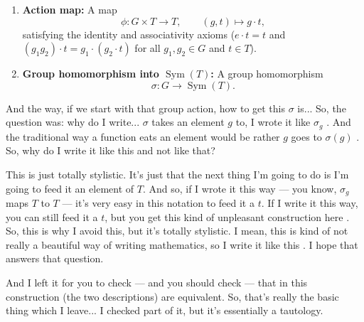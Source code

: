 \begin{content}
\begin{enumerate}[label=\textbf{\arabic*.}]
    \item \textbf{Action map:} A map
    \[
    \phi \colon G \times T \to T, \qquad (g, t) \mapsto g \cdot t,
    \]
    satisfying the identity and associativity axioms ($e \cdot t = t$ and $(g_1 g_2) \cdot t = g_1 \cdot (g_2 \cdot t)$ for all $g_1, g_2 \in G$ and $t \in T$).
    \item \textbf{Group homomorphism into $\operatorname{Sym}(T)$:} A group homomorphism
    \[
    \sigma \colon G \to \operatorname{Sym}(T).
    \]
\end{enumerate}
\end{content}

\begin{speech}[00:03:54 - 00:05:17]
And the way, if we start with that group action, how to get this $\sigma$ is... So, the question was: why do I write... $\sigma$ takes an element $g$ to, I wrote it like $\sigma_g$ . And the traditional way a function eats an element would be rather $g$ goes to $\sigma(g)$ . So, why do I write it like this and not like that?

This is just totally stylistic. It's just that the next thing I'm going to do is I'm going to feed it an element of $T$. And so, if I wrote it this way --- you know, $\sigma_g$ maps $T$ to $T$  --- it's very easy in this notation to feed it a $t$. If I write it this way, you can still feed it a $t$, but you get this kind of unpleasant construction here . So, this is why I avoid this, but it's totally stylistic. I mean, this is kind of not really a beautiful way of writing mathematics, so I write it like this . I hope that answers that question.

And I left it for you to check --- and you should check --- that in this construction (the two descriptions) are equivalent. So, that's really the basic thing which I leave... I checked part of it, but it's essentially a tautology.
\end{speech}

